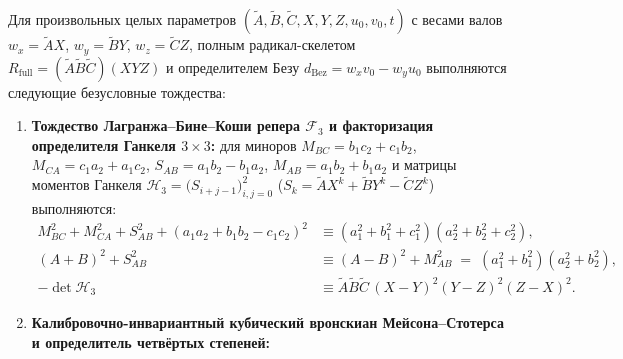 \begin{theorem}
\label{thm:math-abc-planetary-wronskian-full}
\leanok
Для произвольных целых параметров $(\widetilde{A}, \widetilde{B}, \widetilde{C}, X, Y, Z, u_0, v_0, t)$ с весами валов $w_x = \widetilde{A}X$, $w_y = \widetilde{B}Y$, $w_z = \widetilde{C}Z$, полным радикал-скелетом $R_{\mathrm{full}} = (\widetilde{A}\widetilde{B}\widetilde{C})(X Y Z)$ и определителем Безу $d_{\mathrm{Bez}} = w_x v_0 - w_y u_0$ выполняются следующие безусловные тождества:
\begin{enumerate}[label=\textbf{(\arabic*)},leftmargin=*]
\item \textbf{Тождество Лагранжа--Бине--Коши репера $\mathcal{F}_3$ и факторизация определителя Ганкеля $3\times 3$:}
  для миноров $M_{BC} = b_1 c_2 + c_1 b_2$, $M_{CA} = c_1 a_2 + a_1 c_2$, $S_{AB} = a_1 b_2 - b_1 a_2$, $M_{AB} = a_1 b_2 + b_1 a_2$ и матрицы моментов Ганкеля $\mathcal{H}_3 = \bigl(S_{i+j-1}\bigr)_{i,j=0}^2$ ($S_k = \widetilde{A}X^k + \widetilde{B}Y^k - \widetilde{C}Z^k$) выполняются:
  \begin{align}
    M_{BC}^2 + M_{CA}^2 + S_{AB}^2 + (a_1 a_2 + b_1 b_2 - c_1 c_2)^2 &\equiv (a_1^2 + b_1^2 + c_1^2)(a_2^2 + b_2^2 + c_2^2), \label{eq:math-frame-f3-lagrange} \\
    (A + B)^2 + S_{AB}^2 &\equiv (A - B)^2 + M_{AB}^2 \;=\; (a_1^2 + b_1^2)(a_2^2 + b_2^2), \label{eq:math-brahmagupta-shafts} \\
    -\det\mathcal{H}_3 &\equiv \widetilde{A}\widetilde{B}\widetilde{C}\,(X - Y)^2(Y - Z)^2(Z - X)^2. \label{eq:math-hankel-vandermonde-det}
  \end{align}
\item \textbf{Калибровочно-инвариантный кубический вронскиан Мейсона--Стотерса и определитель четвёртых степеней:}

\end{enumerate}
\end{theorem}
